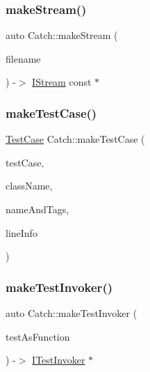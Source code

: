 \mbox{\label{namespace_catch_af6d27462573d60c30c51acf1c980e3ff}} 
\subsubsection{\texorpdfstring{make\+Stream()}{makeStream()}}
{\footnotesize\ttfamily auto Catch\+::make\+Stream (\begin{DoxyParamCaption}\item[{\mbox{\hyperlink{class_catch_1_1_string_ref}{String\+Ref}} const \&}]{filename }\end{DoxyParamCaption}) -\/$>$  \mbox{\hyperlink{struct_catch_1_1_i_stream}{I\+Stream}} const $\ast$}

\mbox{\label{namespace_catch_a5e63df38d06a43d4cee17454e724b5c0}} 
\subsubsection{\texorpdfstring{make\+Test\+Case()}{makeTestCase()}}
{\footnotesize\ttfamily \mbox{\hyperlink{class_catch_1_1_test_case}{Test\+Case}} Catch\+::make\+Test\+Case (\begin{DoxyParamCaption}\item[{\mbox{\hyperlink{struct_catch_1_1_i_test_invoker}{I\+Test\+Invoker}} $\ast$}]{test\+Case,  }\item[{std\+::string const \&}]{class\+Name,  }\item[{\mbox{\hyperlink{struct_catch_1_1_name_and_tags}{Name\+And\+Tags}} const \&}]{name\+And\+Tags,  }\item[{\mbox{\hyperlink{struct_catch_1_1_source_line_info}{Source\+Line\+Info}} const \&}]{line\+Info }\end{DoxyParamCaption})}

\mbox{\label{namespace_catch_ab3d8ccbc900fe50322c39ecbba52f536}} 
\subsubsection{\texorpdfstring{make\+Test\+Invoker()}{makeTestInvoker()}\hspace{0.1cm}{\footnotesize\ttfamily [1/2]}}
{\footnotesize\ttfamily auto Catch\+::make\+Test\+Invoker (\begin{DoxyParamCaption}\item[{void($\ast$)()}]{test\+As\+Function }\end{DoxyParamCaption}) -\/$>$  \mbox{\hyperlink{struct_catch_1_1_i_test_invoker}{I\+Test\+Invoker}} $\ast$\hspace{0.3cm}{\ttfamily [noexcept]}}

